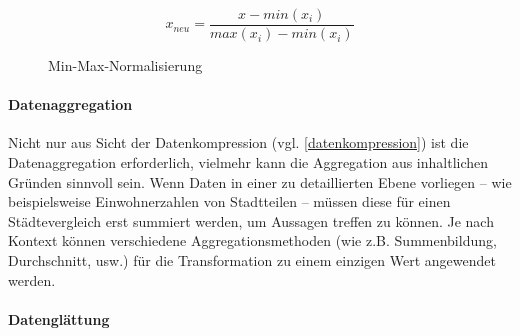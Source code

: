 \begin{figure}[H]
\begin{equation}
x_{neu} = \frac{x - min(x_i)}{max(x_i) - min(x_i)}
\end{equation}
\caption{Min-Max-Normalisierung}
\label{minmax}
\end{figure}

\paragraph{Datenaggregation}
Nicht nur aus Sicht der Datenkompression (vgl. \vref{datenkompression}) ist die Datenaggregation erforderlich, vielmehr \glqq kann die Aggregation aus inhaltlichen Gründen sinnvoll sein.\grqq{} Wenn Daten in einer zu detaillierten Ebene vorliegen -- wie beispielsweise Einwohnerzahlen von Stadtteilen -- müssen diese für einen Städtevergleich erst summiert werden, um Aussagen treffen zu können. Je nach Kontext können verschiedene Aggregationsmethoden (wie z.B. Summenbildung, Durchschnitt, usw.) für die Transformation zu einem einzigen Wert angewendet werden.

\paragraph{Datenglättung}
